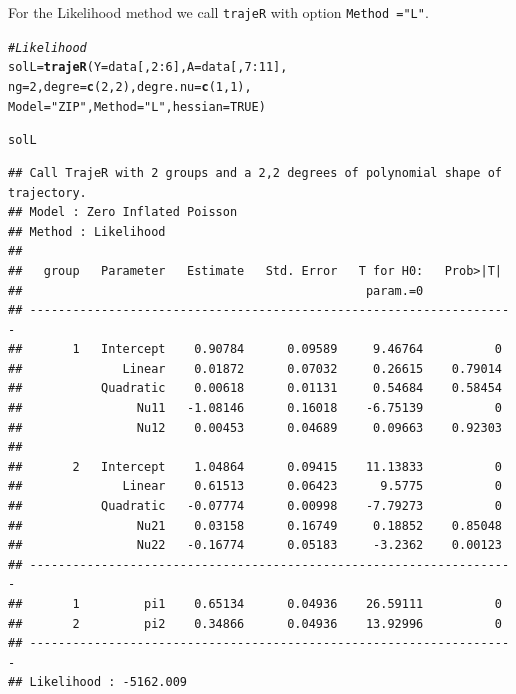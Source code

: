 \documentclass{article}\usepackage[]{graphicx}\usepackage[]{color}
\makeatletter
\newcommand{\hlnum}[1]{\textcolor[rgb]{0.686,0.059,0.569}{#1}}%
\newcommand{\hlstr}[1]{\textcolor[rgb]{0.192,0.494,0.8}{#1}}%
\newcommand{\hlcom}[1]{\textcolor[rgb]{0.678,0.584,0.686}{\textit{#1}}}%
\newcommand{\hlopt}[1]{\textcolor[rgb]{0,0,0}{#1}}%
\newcommand{\hlstd}[1]{\textcolor[rgb]{0.345,0.345,0.345}{#1}}%
\newcommand{\hlkwb}[1]{\textcolor[rgb]{0.69,0.353,0.396}{#1}}%
\newcommand{\hlkwc}[1]{\textcolor[rgb]{0.333,0.667,0.333}{#1}}%
\newcommand{\hlkwd}[1]{\textcolor[rgb]{0.737,0.353,0.396}{\textbf{#1}}}%
\newenvironment{kframe}{%
 \def\at@end@of@kframe{}%
 \ifinner\ifhmode%
  \def\at@end@of@kframe{\end{minipage}}%
  \begin{minipage}{\columnwidth}%
 \fi\fi%
 \def\FrameCommand##1{\hskip\@totalleftmargin \hskip-\fboxsep
 \colorbox{shadecolor}{##1}\hskip-\fboxsep
     \hskip-\linewidth \hskip-\@totalleftmargin \hskip\columnwidth}%
 \MakeFramed {\advance\hsize-\width
   \@totalleftmargin\z@ \linewidth\hsize
   \@setminipage}}%
 {\par\unskip\endMakeFramed%
 \at@end@of@kframe}
\newenvironment{knitrout}{}{} %
\makeatother
\begin{document}
For the Likelihood method we call \verb|trajeR| with option \verb|Method ="L"|.
\begin{knitrout}
\color{fgcolor}\begin{kframe}
\begin{alltt}
\hlcom{# Likelihood}
\hlstd{solL} \hlkwb{=} \hlkwd{trajeR}\hlstd{(}\hlkwc{Y} \hlstd{= data[,}\hlnum{2}\hlopt{:}\hlnum{6}\hlstd{],} \hlkwc{A} \hlstd{= data[,}\hlnum{7}\hlopt{:}\hlnum{11}\hlstd{],}
              \hlkwc{ng} \hlstd{=} \hlnum{2}\hlstd{,} \hlkwc{degre}\hlstd{=}\hlkwd{c}\hlstd{(}\hlnum{2}\hlstd{,}\hlnum{2}\hlstd{),} \hlkwc{degre.nu} \hlstd{=} \hlkwd{c}\hlstd{(}\hlnum{1}\hlstd{,}\hlnum{1}\hlstd{),}
              \hlkwc{Model}\hlstd{=}\hlstr{"ZIP"}\hlstd{,} \hlkwc{Method} \hlstd{=} \hlstr{"L"}\hlstd{,} \hlkwc{hessian} \hlstd{=} \hlnum{TRUE}\hlstd{)}
\end{alltt}
\end{kframe}
\end{knitrout}
\begin{knitrout}
\color{fgcolor}\begin{kframe}
\begin{alltt}
\hlstd{solL}
\end{alltt}
\begin{verbatim}
## Call TrajeR with 2 groups and a 2,2 degrees of polynomial shape of trajectory.
## Model : Zero Inflated Poisson
## Method : Likelihood 
##  
##   group   Parameter   Estimate   Std. Error   T for H0:   Prob>|T|  
##                                                param.=0             
## --------------------------------------------------------------------
##       1   Intercept    0.90784      0.09589     9.46764          0  
##              Linear    0.01872      0.07032     0.26615    0.79014  
##           Quadratic    0.00618      0.01131     0.54684    0.58454  
##                Nu11   -1.08146      0.16018    -6.75139          0  
##                Nu12    0.00453      0.04689     0.09663    0.92303  
##                                                                     
##       2   Intercept    1.04864      0.09415    11.13833          0  
##              Linear    0.61513      0.06423      9.5775          0  
##           Quadratic   -0.07774      0.00998    -7.79273          0  
##                Nu21    0.03158      0.16749     0.18852    0.85048  
##                Nu22   -0.16774      0.05183     -3.2362    0.00123  
## --------------------------------------------------------------------
##       1         pi1    0.65134      0.04936    26.59111          0  
##       2         pi2    0.34866      0.04936    13.92996          0  
## --------------------------------------------------------------------
## Likelihood : -5162.009
\end{verbatim}
\end{kframe}
\end{knitrout}
\end{document}
